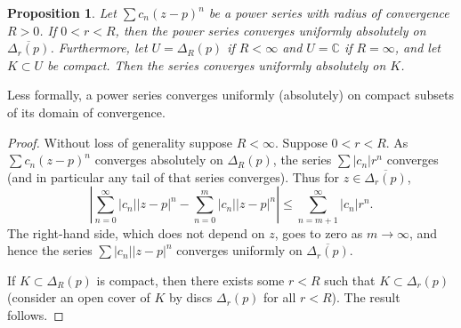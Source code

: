 \documentclass[12pt,openany]{book}
\newcommand{\sabs}[1]{\lvert {#1} \rvert}
\newcommand{\abs}[1]{\left\lvert {#1} \right\rvert}
\newcommand{\C}{{\mathbb{C}}}
\theoremstyle{plain}
\newtheorem{prop}[thm]{Proposition}
\theoremstyle{remark}
\theoremstyle{definition}
\theoremstyle{exercise}
\theoremstyle{example}
\begin{document}
\begin{prop}
Let $\sum c_n {(z-p)}^n$ be a power series with radius of convergence $R
> 0$.  If $0 < r < R$, then the power series converges uniformly absolutely
on $\overline{\Delta_r(p)}$. Furthermore, let $U = \Delta_R(p)$ if $R < \infty$ and
$U = \C$ if $R=\infty$, and let $K \subset U$ be compact.
Then the series converges uniformly absolutely on $K$.
\end{prop}

Less formally, a power series converges uniformly (absolutely) on
compact subsets of its domain of convergence.

\begin{proof}
Without loss of generality suppose $R < \infty$.
Suppose $0 < r < R$.  As $\sum c_n {(z-p)}^n$ converges absolutely
on $\Delta_R(p)$, the series
$\sum \sabs{c_n} r^n$ converges (and in particular any tail of
that series converges).  Thus for $z \in \overline{\Delta_r(p)}$,
\begin{equation*}
\abs{
\sum_{n=0}^\infty \sabs{c_n} \sabs{z-p}^n
-
\sum_{n=0}^{m} \sabs{c_n} \sabs{z-p}^n
}
\leq
\sum_{n=m+1}^\infty \sabs{c_n} r^n .
\end{equation*}
The right-hand side, which does not depend on $z$,
goes to zero as $m \to \infty$, and hence 
the series $\sum \sabs{c_n} \sabs{z-p}^n$ converges uniformly
on $\overline{\Delta_r(p)}$.

If $K \subset \Delta_{R}(p)$ is compact, then there exists some $r <
R$ such that $K \subset \Delta_r(p)$ (consider an open cover of
$K$ by discs $\Delta_r(p)$ for all $r < R$).  The result follows.
\end{proof}
\end{document}
